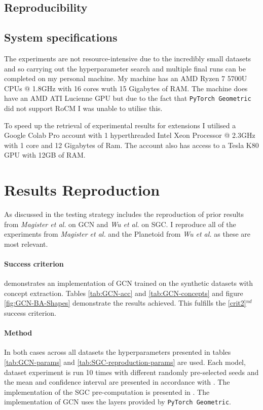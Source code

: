 \subsection{Reproducibility}

\subsection{System specifications}
The experiments are not resource-intensive due to the incredibly small datasets and so carrying out the hyperparameter search and multiple final runs can be completed on my personal machine.
My machine has an AMD Ryzen 7 5700U CPUs @ 1.8GHz with 16 cores wuth 15 Gigabytes of RAM.
The machine does have an AMD ATI Lucienne GPU but due to the fact that \texttt{PyTorch Geometric}\cite{paszke2019pytorch} did not support RoCM I was unable to utilise this.

To speed up the retrieval of experimental results for extensions I utilised a Google Colab Pro account with 1 hyperthreaded Intel Xeon Processor @ 2.3GHz with 1 core and 12 Gigabytes of Ram.
The account also has access to a Tesla K80 GPU with 12GB of RAM.


\section{Results Reproduction}
\label{sec:reproduction}

As discussed in  the testing strategy includes the reproduction of prior results from \textit{Magister et al.}\cite{magister2021gcexplainer} on GCN and \textit{Wu et al.}\cite{wu2019simplifying} on SGC.
I reproduce all of the experiments from \textit{Magister et al.} and the Planetoid\cite{kipf2016semi} from \textit{Wu et al.} as these are most relevant.

\paragraph{Success criterion}
 demonstrates an implementation of GCN trained on the synthetic datasets with concept extraction.
Tables \ref{tab:GCN-acc} and \ref{tab:GCN-concepts} and figure \ref{fig:GCN-BA-Shapes} demonstrate the results achieved.
This fulfills the \ref{crit2}$^{nd}$ success criterion.

\paragraph{Method}
In both cases across all datasets the hyperparameters presented in tables \ref{tab:GCN-params} and \ref{tab:SGC-reproduction-params} are used.
Each model, dataset experiment is run 10 times with different randomly pre-selected seeds and the mean and confidence interval are presented in accordance with .
The implementation of the SGC pre-computation is presented in .
The implementation of GCN uses the layers provided by \texttt{PyTorch Geometric}\cite{Fey/Lenssen/2019}.

